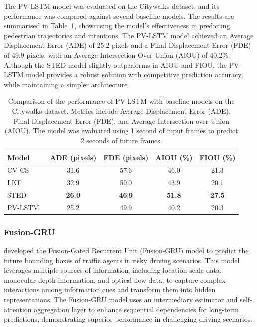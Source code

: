 \documentclass[12pt,oneside]{book} %
\begin{document}
The PV-LSTM model was evaluated on the Citywalks dataset, and its performance
was compared against several baseline models. The results are summarised in
Table~\ref{tab:pv-lstm-results}, showcasing the model's effectiveness in
predicting pedestrian trajectories and intentions. The PV-LSTM model achieved
an Average Displacement Error (ADE) of 25.2 pixels and a Final Displacement
Error (FDE) of 49.9 pixels, with an Average Intersection Over Union (AIOU) of
40.2\%. Although the STED model slightly outperforms in AIOU and FIOU, the
PV-LSTM model provides a robust solution with competitive prediction accuracy,
while maintaining a simpler architecture.

\begin{table}[H]
    \centering
    \caption{Comparison of the performance of PV-LSTM with baseline models on the Citywalks dataset. Metrics include Average Displacement Error (ADE), Final Displacement Error (FDE), and Average Intersection-over-Union (AIOU). The model was evaluated using 1 second of input frames to predict 2 seconds of future frames.}
    \begin{adjustbox}{max width=\textwidth}
        \begin{tabular}{lcccc}
            \toprule
            \textbf{Model}                                   & \textbf{ADE (pixels)} & \textbf{FDE (pixels)} & \textbf{AIOU (\%)} & \textbf{FIOU (\%)} \\ 
            \midrule
            CV-CS~\cite{DBLP:journals/corr/abs-2010-10270}   & 31.6                  & 57.6                  & 46.0               & 21.3               \\
            LKF~\cite{DBLP:journals/corr/abs-2010-10270}     & 32.9                  & 59.0                  & 43.9               & 20.1               \\
            STED~\cite{DBLP:journals/corr/abs-2010-10270}    & \textbf{26.0}         & \textbf{46.9}         & \textbf{51.8}      & \textbf{27.5}      \\
            PV-LSTM~\cite{DBLP:journals/corr/abs-2010-10270} & 25.2                  & 49.9                  & 40.2               & 20.3               \\
            \bottomrule
        \end{tabular}
    \end{adjustbox}
    \label{tab:pv-lstm-results}
\end{table}

\subsubsection*{Fusion-GRU}
\citet{FusionGRU} developed the Fusion-Gated Recurrent
Unit (Fusion-GRU) model to predict the future bounding boxes of traffic agents
in risky driving scenarios. This model leverages multiple sources of
information, including location-scale data, monocular depth information, and
optical flow data, to capture complex interactions among information cues and
transform them into hidden representations. The Fusion-GRU model uses an
intermediary estimator and self-attention aggregation layer to enhance
sequential dependencies for long-term predictions, demonstrating superior
performance in challenging driving scenarios.
\end{document}
